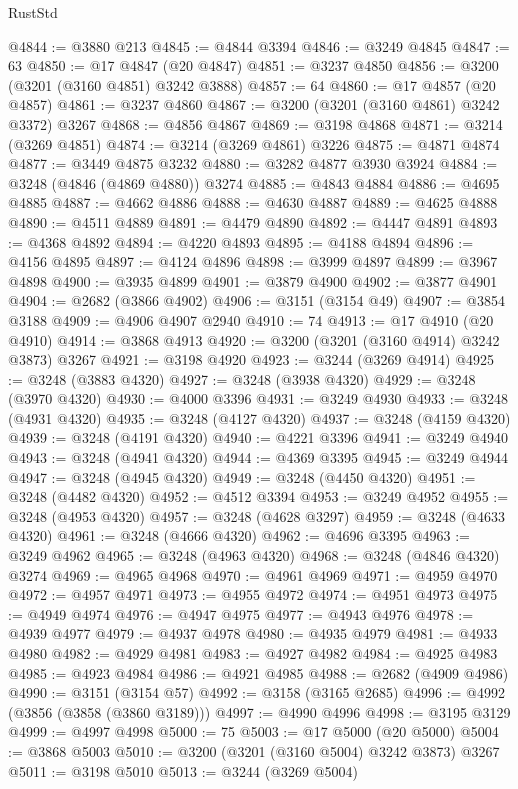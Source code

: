 \begin{lexlean}{RustStd}
\begin{coremodule}
{\begin{coremodule}
{{{{{{{{{{{{{{{{{{{{{{{{{@4844 := @3880 @213
@4845 := @4844 @3394
@4846 := @3249 @4845
@4847 := 63
@4850 := @17 @4847 (@20 @4847)
@4851 := @3237 @4850
@4856 := @3200 (@3201 (@3160 @4851) @3242 @3888)
@4857 := 64
@4860 := @17 @4857 (@20 @4857)
@4861 := @3237 @4860
@4867 := @3200 (@3201 (@3160 @4861) @3242 @3372) @3267
@4868 := @4856 @4867
@4869 := @3198 @4868
@4871 := @3214 (@3269 @4851)
@4874 := @3214 (@3269 @4861) @3226
@4875 := @4871 @4874
@4877 := @3449 @4875 @3232
@4880 := @3282 @4877 @3930 @3924
@4884 := @3248 (@4846 (@4869 @4880)) @3274
@4885 := @4843 @4884
@4886 := @4695 @4885
@4887 := @4662 @4886
@4888 := @4630 @4887
@4889 := @4625 @4888
@4890 := @4511 @4889
@4891 := @4479 @4890
@4892 := @4447 @4891
@4893 := @4368 @4892
@4894 := @4220 @4893
@4895 := @4188 @4894
@4896 := @4156 @4895
@4897 := @4124 @4896
@4898 := @3999 @4897
@4899 := @3967 @4898
@4900 := @3935 @4899
@4901 := @3879 @4900
@4902 := @3877 @4901
@4904 := @2682 (@3866 @4902)
@4906 := @3151 (@3154 @49)
@4907 := @3854 @3188
@4909 := @4906 @4907 @2940
@4910 := 74
@4913 := @17 @4910 (@20 @4910)
@4914 := @3868 @4913
@4920 := @3200 (@3201 (@3160 @4914) @3242 @3873) @3267
@4921 := @3198 @4920
@4923 := @3244 (@3269 @4914)
@4925 := @3248 (@3883 @4320)
@4927 := @3248 (@3938 @4320)
@4929 := @3248 (@3970 @4320)
@4930 := @4000 @3396
@4931 := @3249 @4930
@4933 := @3248 (@4931 @4320)
@4935 := @3248 (@4127 @4320)
@4937 := @3248 (@4159 @4320)
@4939 := @3248 (@4191 @4320)
@4940 := @4221 @3396
@4941 := @3249 @4940
@4943 := @3248 (@4941 @4320)
@4944 := @4369 @3395
@4945 := @3249 @4944
@4947 := @3248 (@4945 @4320)
@4949 := @3248 (@4450 @4320)
@4951 := @3248 (@4482 @4320)
@4952 := @4512 @3394
@4953 := @3249 @4952
@4955 := @3248 (@4953 @4320)
@4957 := @3248 (@4628 @3297)
@4959 := @3248 (@4633 @4320)
@4961 := @3248 (@4666 @4320)
@4962 := @4696 @3395
@4963 := @3249 @4962
@4965 := @3248 (@4963 @4320)
@4968 := @3248 (@4846 @4320) @3274
@4969 := @4965 @4968
@4970 := @4961 @4969
@4971 := @4959 @4970
@4972 := @4957 @4971
@4973 := @4955 @4972
@4974 := @4951 @4973
@4975 := @4949 @4974
@4976 := @4947 @4975
@4977 := @4943 @4976
@4978 := @4939 @4977
@4979 := @4937 @4978
@4980 := @4935 @4979
@4981 := @4933 @4980
@4982 := @4929 @4981
@4983 := @4927 @4982
@4984 := @4925 @4983
@4985 := @4923 @4984
@4986 := @4921 @4985
@4988 := @2682 (@4909 @4986)
@4990 := @3151 (@3154 @57)
@4992 := @3158 (@3165 @2685)
@4996 := @4992 (@3856 (@3858 (@3860 @3189)))
@4997 := @4990 @4996
@4998 := @3195 @3129
@4999 := @4997 @4998
@5000 := 75
@5003 := @17 @5000 (@20 @5000)
@5004 := @3868 @5003
@5010 := @3200 (@3201 (@3160 @5004) @3242 @3873) @3267
@5011 := @3198 @5010
@5013 := @3244 (@3269 @5004)
}}}}}}}}}}}}}}}}}}}}}}}}}
\end{coremodule}}
\end{coremodule}
\end{lexlean}
